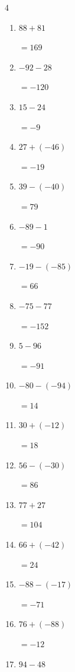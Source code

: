 \begin{multicols}{4}
\begin{enumerate}
        $=58$

  \item $88+81$

        $=169$

  \item $-92-28$

        $=-120$

  \item $15-24$

        $=-9$

  \item $27+(-46)$

        $=-19$

  \item $39-(-40)$

        $=79$

\columnbreak %

  \item $-89-1$

        $=-90$

  \item $-19-(-85)$

        $=66$

  \item $-75-77$

        $=-152$

  \item $5-96$

        $=-91$

  \item $-80-(-94)$

        $=14$

  \item $30+(-12)$

        $=18$

  \item $56-(-30)$

        $=86$

  \item $77+27$

        $=104$

  \item $66+(-42)$

        $=24$

  \item $-88-(-17)$

        $=-71$

  \item $76+(-88)$

        $=-12$

  \item $94-48$


\end{enumerate}
\end{multicols}
